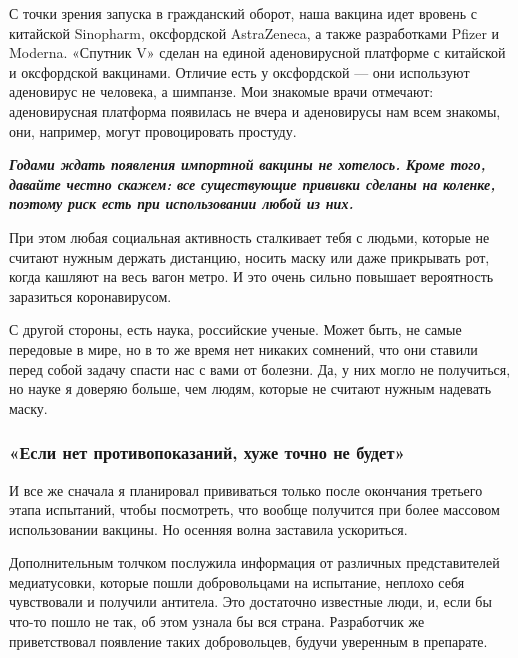 С точки зрения запуска в гражданский оборот, наша вакцина идет вровень с
китайской Sinopharm, оксфордской AstraZeneca, а также разработками Pfizer и
Moderna. «Спутник V» сделан на единой аденовирусной платформе с китайской и
оксфордской вакцинами. Отличие есть у оксфордской — они используют аденовирус
не человека, а шимпанзе. Мои знакомые врачи отмечают: аденовирусная платформа
появилась не вчера и аденовирусы нам всем знакомы, они, например, могут
провоцировать простуду.

\begin{leftbar}
\begingroup
\em\large\bfseries
Годами ждать появления импортной вакцины не хотелось. Кроме того, давайте
        честно скажем: все существующие прививки сделаны на коленке, поэтому
        риск есть при использовании любой из них.
\endgroup
\end{leftbar}

При этом любая социальная активность сталкивает тебя с людьми, которые не
считают нужным держать дистанцию, носить маску или даже прикрывать рот, когда
кашляют на весь вагон метро. И это очень сильно повышает вероятность заразиться
коронавирусом.

С другой стороны, есть наука, российские ученые. Может быть, не самые передовые
в мире, но в то же время нет никаких сомнений, что они ставили перед собой
задачу спасти нас с вами от болезни. Да, у них могло не получиться, но науке я
доверяю больше, чем людям, которые не считают нужным надевать маску.

\subsubsection{«Если нет противопоказаний, хуже точно не будет»}

И все же сначала я планировал прививаться только после окончания третьего этапа
испытаний, чтобы посмотреть, что вообще получится при более массовом
использовании вакцины. Но осенняя волна заставила ускориться.

Дополнительным толчком послужила информация от различных представителей
медиатусовки, которые пошли добровольцами на испытание, неплохо себя
чувствовали и получили антитела. Это достаточно известные люди, и, если бы
что-то пошло не так, об этом узнала бы вся страна. Разработчик же приветствовал
появление таких добровольцев, будучи уверенным в препарате.


